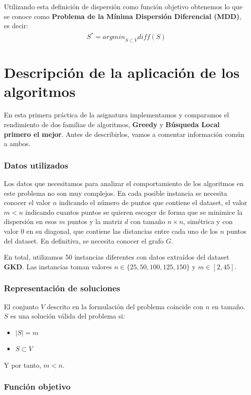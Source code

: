 Utilizando esta definición de dispersión como función objetivo obtenemos lo que se conoce como \textbf{Problema de la Mínima Dispersión Diferencial (MDD)}, es decir: 
\begin{align*}
    S^{*} = {arg min}_{S \subset V} diff(S)
\end{align*}


\part{Descripción de la aplicación de los algoritmos}
En esta primera práctica de la asignatura implementamos y comparamos el rendimiento de dos familias de algoritmos, \textbf{Greedy} y \textbf{Búsqueda Local primero el mejor}. Antes de describirlos, vamos a comentar información común a ambos.


\section{Datos utilizados}
Los datos que necesitamos para analizar el comportamiento de los algoritmos en este problema no son muy complejos. En cada posible instancia se necesita conocer el valor $n$ indicando el número de puntos que contiene el dataset, el valor $m < n$ indicando cuantos puntos se quieren escoger de forma que se minimice la dispersión en esos $m$ puntos y la matriz $d$ con tamaño $n \times n$, simétrica y con valor 0 en su diagonal, que contiene las distancias entre cada uno de los $n$ puntos del dataset. En definitiva, se necesita conocer el grafo $G$.

En total, utilizamos 50 instancias diferentes con datos extraídos del dataset \textbf{GKD}. Las instancias toman valores $n \in \{25,50,100,125,150\}$ y $m \in [2,45]$.


\section{Representación de soluciones}

El conjunto $V$ descrito en la formulación del problema coincide con $n$ en tamaño. $S$ es una solución válida del problema si:
\begin{itemize}
    \item $|S| = m$
    \item $S \subset V$
\end{itemize}
Y por tanto, $m < n$.

\section{Función objetivo}

